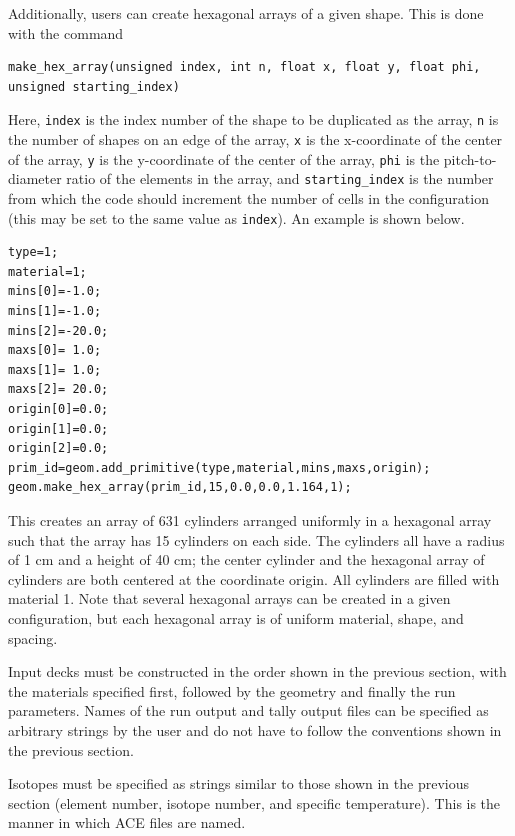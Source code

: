 \documentclass[twoside,a4paper]{refart}
\begin{document}
Additionally, users can create hexagonal arrays of a given shape. This is done with the command

\begin{Verbatim}
make_hex_array(unsigned index, int n, float x, float y, float phi, 
unsigned starting_index)
\end{Verbatim}

Here, \texttt{index} is the index number of the shape to be duplicated as the array, \texttt{n} is the 
number of shapes on an edge of the array, \texttt{x} is the x-coordinate of the center of the array,
\texttt{y} is the y-coordinate of the center of the array, \texttt{phi} is the pitch-to-diameter ratio 
of the elements in the array, and \texttt{starting\_index} is the number from which the code should 
increment the number of cells in the configuration (this may be set to the same value as \texttt{index}). 
An example is shown below.

\begin{verbatim}
type=1;
material=1;
mins[0]=-1.0;
mins[1]=-1.0;
mins[2]=-20.0;
maxs[0]= 1.0;
maxs[1]= 1.0;
maxs[2]= 20.0;
origin[0]=0.0;
origin[1]=0.0;
origin[2]=0.0;
prim_id=geom.add_primitive(type,material,mins,maxs,origin);
geom.make_hex_array(prim_id,15,0.0,0.0,1.164,1); 
\end{verbatim}

This creates an array of 631 cylinders arranged uniformly in a hexagonal array such that the array has 15
cylinders on each side. The cylinders all have a radius of 1 cm and a height of 40 cm; the center cylinder
and the hexagonal array of cylinders are both centered at the coordinate origin. All cylinders are filled
with material 1. Note that several hexagonal arrays can be created in a given configuration, but each 
hexagonal array is of uniform material, shape, and spacing.

Input decks must be constructed in the order shown in the previous section, with the materials specified first, followed by the geometry and finally the run parameters. Names of the run output and tally output
files can be specified as arbitrary strings by the user and do not have to follow the conventions shown 
in the previous section.

Isotopes must be specified as strings similar to those shown in the previous section (element number,
isotope number, and specific temperature). This is the manner in which ACE files are named.

\printindex
\end{document}
